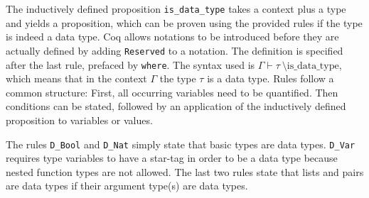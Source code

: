 \documentclass[paper = a4, fleqn, abstract=on, twoside]{scrreprt}
\newcommand{\coqinline}[1]{\texttt{#1}}
\begin{document}
The inductively defined proposition \coqinline{is_data_type} takes a context plus a type and yields a proposition, which can be proven using the provided rules if the type is indeed a data type. Coq allows notations to be introduced before they are actually defined by adding \coqinline{Reserved} to a notation. The definition is specified after the last rule, prefaced by \coqinline{where}. The syntax used is $\Gamma \vdash \tau \: \text{\textbackslash is\_data\_type}$, which means that in the context $\Gamma$ the type $\tau$ is a data type. Rules follow a common structure: First, all occurring variables need to be quantified. Then conditions can be stated, followed by an application of the inductively defined proposition to variables or values.
\par
The rules \coqinline{D_Bool} and \coqinline{D_Nat} simply state that basic types are data types. \coqinline{D_Var} requires type variables to have a star-tag in order to be a data type because nested function types are not allowed.  The last two rules state that lists and pairs are data types if their argument type(s) are data types. 
\par
\end{document}
